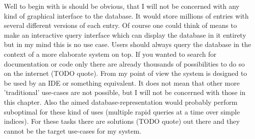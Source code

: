 \documentclass[11p]{scrartcl}
\begin{document}
Well to begin with is should be obvious, that I will not be concerned with any kind of graphical interface to the database. It would store millions of entries with several different versions of each entry. Of course one could think of means to make an interactive query interface which can display the database in it entirety but in my mind this is no use case. Users should always query the database in the context of a more elaborate system on top. If you wanted to search for documentation or code only there are already thousands of possibilities to do so on the internet (TODO quote).
From my point of view the system is designed to be used by an IDE or something equivalent. It does not mean that other more 'traditional' use-cases are not possible, but I will not be concerned with those in this chapter. Also the aimed database-representation would probably perform suboptimal for these kind of uses (multiple rapid queries at a time over simple indices). For these tasks there are solutions (TODO quote) out there and they cannot be the target use-cases for my system.
\end{document}
